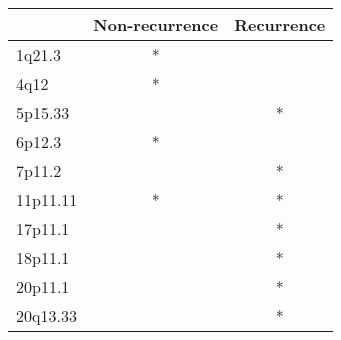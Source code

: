 \begin{tabular}{lcc}
\toprule
{} & Non-recurrence & Recurrence \\
\midrule
1q21.3   &              * &            \\
4q12     &              * &            \\
5p15.33  &                &          * \\
6p12.3   &              * &            \\
7p11.2   &                &          * \\
11p11.11 &              * &          * \\
17p11.1  &                &          * \\
18p11.1  &                &          * \\
20p11.1  &                &          * \\
20q13.33 &                &          * \\
\bottomrule
\end{tabular}
